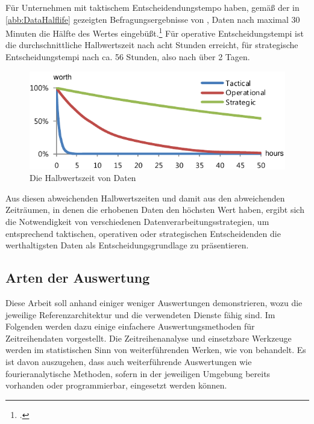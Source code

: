 Für Unternehmen mit taktischem Entscheidendungstempo haben, gemäß der in \autoref{abb:DataHalflife} gezeigten Befragungsergebnisse von \citeauthor{NucleusResarchInc..2012}, Daten nach maximal 30 Minuten die Hälfte des Wertes eingebüßt.\footcite[Vgl. auch im Folgenden][6]{NucleusResarchInc..2012} Für operative Entscheidungstempi ist die durchschnittliche Halbwertszeit nach acht Stunden erreicht, für strategische Entscheidungstempi nach ca. 56 Stunden, also nach über 2 Tagen.



\begin{figure}[H]
\centering
\includegraphics[width=\textwidth]{graphics/half-life-data.pdf}
\caption[Die Halbwertszeit von Daten]{Die Halbwertszeit von Daten\footnotemark}
\label{abb:DataHalflife}
\end{figure}
Aus diesen abweichenden Halbwertszeiten und damit aus den abweichenden Zeiträumen, in denen die erhobenen Daten den höchsten Wert haben, ergibt sich die Notwendigkeit von verschiedenen Datenverarbeitungsstrategien, um entsprechend taktischen, operativen oder strategischen  Entscheidenden die werthaltigsten Daten als Entscheidungsgrundlage zu präsentieren.

\subsection{Arten der Auswertung}\label{chap:auswertungsarten}
Diese Arbeit soll anhand einiger weniger Auswertungen demonstrieren, wozu die jeweilige Referenzarchitektur und die verwendeten Dienste fähig sind. Im Folgenden werden dazu einige einfachere Auswertungsmethoden für Zeitreihendaten vorgestellt. Die Zeitreihenanalyse und einsetzbare Werkzeuge werden im statistischen Sinn von weiterführenden Werken, wie von \citeauthor{Shumway.2017} behandelt. Es ist davon auszugehen, dass auch weiterführende Auswertungen wie fourieranalytische Methoden, sofern in der jeweiligen Umgebung bereits vorhanden oder programmierbar, eingesetzt werden können.

